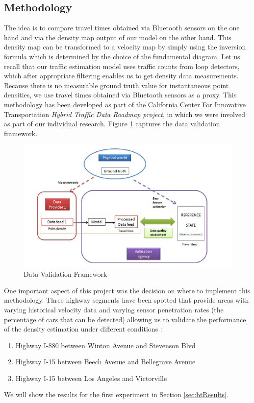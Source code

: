 \documentclass[letterpaper,10pt]{article}
\begin{document}
\subsection{Methodology}

The idea is to compare travel times obtained via Bluetooth sensors on the one hand and via the density map output of our model on the other hand. This density map can be transformed to a velocity map by simply using the inversion formula which is determined by the choice of the fundamental diagram. Let us recall that our traffic estimation model uses traffic counts from loop detectors, which after appropriate filtering enables us to get density data measurements. Because there is no measurable ground truth value for instantaneous point densities, we use travel times obtained via Bluetooth sensors as a proxy. This methodology has been developed as part of the California Center For Innovative Transportation \textit{Hybrid Traffic Data Roadmap project}, in which we were involved as part of our individual research. Figure \ref{fig:dataValFrame} captures the data validation framework.

\begin{figure}
  \centering
  \includegraphics[width = 12cm]{figures/dataValidation.png}                
  \caption{Data Validation Framework}
  \label{fig:dataValFrame}
\end{figure}

 One important aspect of this project was the decision on where to implement this methodology. Three highway segments have been spotted that provide areas with varying historical velocity data and varying sensor penetration rates (the percentage of cars that can be detected) allowing us to validate the performance of the density estimation under different conditions :
\begin{enumerate}
\item Highway I-880 between Winton Avenue and Stevenson Blvd
\item Highway I-15 between Beech Avenue and Bellegrave Avenue
\item Highway I-15 between Los Angeles and Victorville
\end{enumerate}
We will show the results for the first experiment in Section \ref{sec:btResults}.
\end{document}
